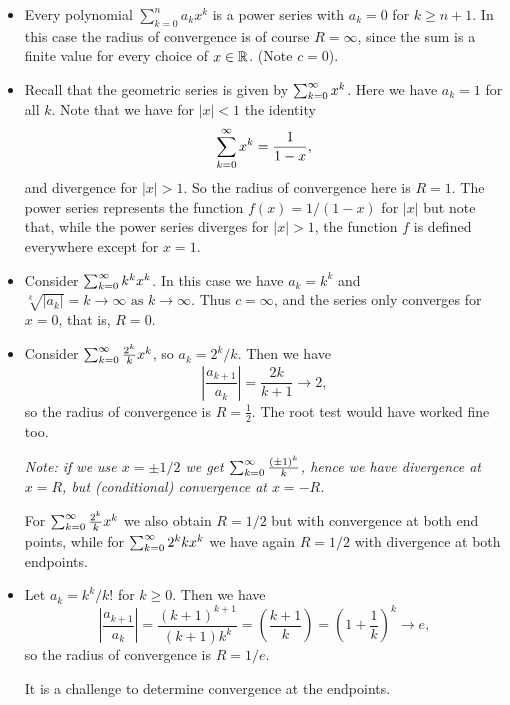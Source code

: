 \documentclass[10pt, a4paper]{article}
\newcommand{\limas}[3][n]{#2 \rightarrow #3 \text{ as } #1 \rightarrow \infty}
\begin{document}
\begin{example}\phantom{}
    \begin{itemize}
        \item Every polynomial $\sum_{k = 0}^{n}a_kx ^ k$ is a power series with $a_k = 0$ for $k \geq n + 1$.
        In this case the radius of convergence is of course $R = \infty$,
        since the sum is a finite value for every choice of $x \in \mathbb{R}$.
        (Note $c = 0$).

        \item Recall that the geometric series is given by $\sum_{k = 0}^{\infty} x ^ k$.
        Here we have $a_k = 1$ for all $k$.
        Note that we have for $|x| < 1$ the identity
        \[
        \sum_{k = 0}^{\infty} x ^ k = \frac{1}{1 - x},
        \]
        and divergence for $|x| > 1$.
        So the radius of convergence here is $R = 1$.
        The power series represents the function $f(x) = 1 / (1 - x)$ for $|x|$ but note that,
        while the power series diverges for $|x| > 1$,
        the function $f$ is defined everywhere except for $x = 1$.

        \item Consider $\sum_{k = 0}^{\infty} k ^ kx ^ k$.
        In this case we have $a_k = k ^ k$ and $\limas[k]{\sqrt[k]{|a_k|} = k}{\infty}$.
        Thus $c = \infty$,
        and the series only converges for $x = 0$,
        that is,
        $R = 0$.

        \item Consider $\sum_{k = 0}^{\infty}\frac{2 ^ k}{k}x ^ k$,
        so $a_k = 2 ^ k / k$.
        Then we have
        \[
        \left|\frac{a_{k + 1}}{a_k}\right| = \frac{2k}{k + 1} \rightarrow 2,
        \]
        so the radius of convergence is $R = \frac{1}{2}$.
        The root test would have worked fine too.
        
        \textit{Note: if we use $x = \pm 1 / 2$ we get $\sum_{k = 0}^{\infty}\frac{(\pm 1) ^ k}{k}$,
        hence we have divergence at $x = R$,
        but
        (conditional)
        convergence at $x = -R$.}

        For $\sum_{k = 0}^{\infty}\frac{2 ^ k}{k}x ^ k$ we also obtain $R = 1 / 2$ but with convergence at both end points,
        while for $\sum_{k = 0}^{\infty} 2 ^ kk x ^ k$ we have again $R = 1 / 2$ with divergence at both endpoints.
        
        \item Let $a_k = k ^ k / k!$ for $k \geq 0$.
        Then we have
        \[
        \left|\frac{a_{k + 1}}{a_k}\right| = \frac{(k + 1) ^ {k + 1}}{(k + 1)k ^ k} = \left(\frac{k + 1}{k}\right) = \left(1 + \frac{1}{k}\right) ^ k \rightarrow e,
        \]
        so the radius of convergence is $R = 1 / e$.
        
        It is a challenge to determine convergence at the endpoints.
    \end{itemize}
\end{example}
\end{document}
